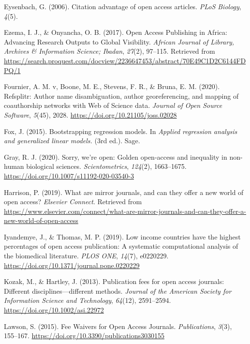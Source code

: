 \documentclass[
  english,
  man]{apa6}
\begin{document}
\leavevmode\hypertarget{ref-eysenbach_citation_2006}{}%
Eysenbach, G. (2006). Citation advantage of open access articles. \emph{PLoS Biology}, \emph{4}(5).

\leavevmode\hypertarget{ref-ezema_open_2017}{}%
Ezema, I. J., \& Onyancha, O. B. (2017). Open Access Publishing in Africa: Advancing Research Outputs to Global Visibility. \emph{African Journal of Library, Archives \& Information Science; Ibadan}, \emph{27}(2), 97--115. Retrieved from \url{https://search.proquest.com/docview/2236647453/abstract/70E49C1D2C6144FDPQ/1}

\leavevmode\hypertarget{ref-fournier_refsplitr_2020}{}%
Fournier, A. M. v, Boone, M. E., Stevens, F. R., \& Bruna, E. M. (2020). Refsplitr: Author name disambiguation, author georeferencing, and mapping of coauthorship networks with Web of Science data. \emph{Journal of Open Source Software}, \emph{5}(45), 2028. \url{https://doi.org/10.21105/joss.02028}

\leavevmode\hypertarget{ref-fox_bootstrapping_2015}{}%
Fox, J. (2015). Bootstrapping regression models. In \emph{Applied regression analysis and generalized linear models.} (3rd ed.). Sage.

\leavevmode\hypertarget{ref-gray_sorry_2020}{}%
Gray, R. J. (2020). Sorry, we're open: Golden open-access and inequality in non-human biological sciences. \emph{Scientometrics}, \emph{124}(2), 1663--1675. \url{https://doi.org/10.1007/s11192-020-03540-3}

\leavevmode\hypertarget{ref-harrison_what_2019}{}%
Harrison, P. (2019). What are mirror journals, and can they offer a new world of open access? \emph{Elsevier Connect}. Retrieved from \url{https://www.elsevier.com/connect/what-are-mirror-journals-and-can-they-offer-a-new-world-of-open-access}

\leavevmode\hypertarget{ref-iyandemye_low_2019}{}%
Iyandemye, J., \& Thomas, M. P. (2019). Low income countries have the highest percentages of open access publication: A systematic computational analysis of the biomedical literature. \emph{PLOS ONE}, \emph{14}(7), e0220229. \url{https://doi.org/10.1371/journal.pone.0220229}

\leavevmode\hypertarget{ref-kozak_publication_2013}{}%
Kozak, M., \& Hartley, J. (2013). Publication fees for open access journals: Different disciplines---different methods. \emph{Journal of the American Society for Information Science and Technology}, \emph{64}(12), 2591--2594. \url{https://doi.org/10.1002/asi.22972}

\leavevmode\hypertarget{ref-lawson_fee_2015}{}%
Lawson, S. (2015). Fee Waivers for Open Access Journals. \emph{Publications}, \emph{3}(3), 155--167. \url{https://doi.org/10.3390/publications3030155}
\end{document}
